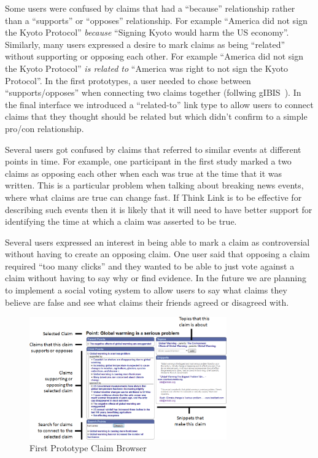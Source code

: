 \documentclass{chi2009}
\begin{document}
Some users were confused by claims that had a ``because'' relationship rather than a ``supports'' or ``opposes'' relationship. For example ``America did not sign the Kyoto Protocol'' {\it because} ``Signing Kyoto would harm the US economy''. Similarly, many users expressed a desire to mark claims as being ``related'' without supporting or opposing each other. For example ``America did not sign the Kyoto Protocol'' {\it is related to} ``America was right to not sign the Kyoto Protocol''. In the first prototypes, a user needed to chose between ``supports/opposes'' when connecting two claims together (follwing gIBIS~\cite{Conklin1987a}). In the final interface we introduced a ``related-to'' link type to allow users to connect claims that they thought should be related but which didn't confirm to a simple pro/con relationship. 

Several users got confused by claims that referred to similar events at different points in time. For example, one participant in the first study marked a two claims as opposing each other when each was true at the time that it was written. This is a particular problem when talking about breaking news events, where what claims are true can change fast. If Think Link is to be effective for describing such events then it is likely that it will need to have better support for identifying the time at which a claim was asserted to be true.

Several users expressed an interest in being able to mark a claim as controversial without having to create an opposing claim. One user said that opposing a claim required ``too many clicks'' and they wanted to be able to just vote against a claim without having to say why or find evidence. In the future we are planning to implement a social voting system to allow users to say what claims they believe are false and see what claims their friends agreed or disagreed with.

\begin{figure}[tb]
	\includegraphics[width=8.5cm]{../screenshots/oldpoint_diagram.png}
	\caption{First Prototype Claim Browser}
	\label{oldbrowser}
\end{figure}
\end{document}
